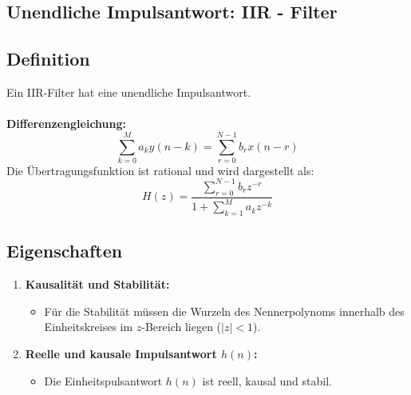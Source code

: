 \documentclass[12pt]{article}
\begin{document}
   \newpage
   \subsection{Unendliche Impulsantwort: IIR - Filter}   %
      \subsection*{Definition}
         Ein IIR-Filter hat eine unendliche Impulsantwort.\\
         \\
         \textbf{Differenzengleichung:}
         \[
            \sum_{k=0}^M a_k y(n-k) = \sum_{r=0}^{N-1} b_r x(n-r)
         \]
         Die Übertragungsfunktion ist rational und wird dargestellt als:
         \[
            H(z) = \frac{\sum_{r=0}^{N-1} b_r z^{-r}}{1 + \sum_{k=1}^M a_k z^{-k}}
         \]

   \subsection*{Eigenschaften}
      \begin{enumerate}
         \item \textbf{Kausalität und Stabilität:}
         \begin{itemize}
            \item Für die Stabilität müssen die Wurzeln des Nennerpolynoms innerhalb des Einheitskreises im \(z\)-Bereich liegen (\(|z| < 1\)).
         \end{itemize}
         \item \textbf{Reelle und kausale Impulsantwort \(h(n)\):}
         \begin{itemize}
            \item Die Einheitspulsantwort \(h(n)\) ist reell, kausal und stabil.
         \end{itemize}
      \end{enumerate}
\end{document}

